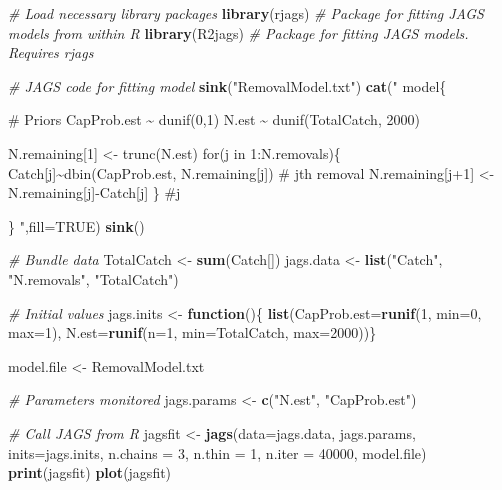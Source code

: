 \documentclass[
]{krantz}
\makeatletter
\newenvironment{Shaded}{\begin{snugshade}}{\end{snugshade}}
\newcommand{\AttributeTok}[1]{\textcolor[rgb]{0.27,0.27,0.27}{#1}}
\newcommand{\CommentTok}[1]{\textcolor[rgb]{0.37,0.37,0.37}{\textit{#1}}}
\newcommand{\ConstantTok}[1]{\textcolor[rgb]{0.37,0.37,0.37}{#1}}
\newcommand{\ControlFlowTok}[1]{\textcolor[rgb]{0.27,0.27,0.27}{\textbf{#1}}}
\newcommand{\DecValTok}[1]{\textcolor[rgb]{0.06,0.06,0.06}{#1}}
\newcommand{\FunctionTok}[1]{\textcolor[rgb]{0.27,0.27,0.27}{\textbf{#1}}}
\newcommand{\NormalTok}[1]{#1}
\newcommand{\OtherTok}[1]{\textcolor[rgb]{0.37,0.37,0.37}{#1}}
\newcommand{\StringTok}[1]{\textcolor[rgb]{0.5,0.5,0.5}{#1}}
\newenvironment{kframe}{%
\medskip{}
\setlength{\fboxsep}{.8em}
 \def\at@end@of@kframe{}%
 \ifinner\ifhmode%
  \def\at@end@of@kframe{\end{minipage}}%
  \begin{minipage}{\columnwidth}%
 \fi\fi%
 \def\FrameCommand##1{\hskip\@totalleftmargin \hskip-\fboxsep
 \colorbox{shadecolor}{##1}\hskip-\fboxsep
     \hskip-\linewidth \hskip-\@totalleftmargin \hskip\columnwidth}%
 \MakeFramed {\advance\hsize-\width
   \@totalleftmargin\z@ \linewidth\hsize
   \@setminipage}}%
 {\par\unskip\endMakeFramed%
 \at@end@of@kframe}
\renewenvironment{Shaded}{\begin{kframe}}{\end{kframe}}
\makeatother
\begin{document}
\begin{Shaded}
\begin{Highlighting}[]
\CommentTok{\# Load necessary library packages}
\FunctionTok{library}\NormalTok{(rjags)   }\CommentTok{\# Package for fitting JAGS models from within R}
\FunctionTok{library}\NormalTok{(R2jags)  }\CommentTok{\# Package for fitting JAGS models. Requires rjags}

\CommentTok{\# JAGS code for fitting model}
\FunctionTok{sink}\NormalTok{(}\StringTok{"RemovalModel.txt"}\NormalTok{)}
  \FunctionTok{cat}\NormalTok{(}\StringTok{"}
\StringTok{model\{}

\StringTok{\# Priors}
\StringTok{ CapProb.est \textasciitilde{} dunif(0,1)}
\StringTok{ N.est \textasciitilde{} dunif(TotalCatch, 2000)}

\StringTok{ N.remaining[1] \textless{}{-} trunc(N.est)}
\StringTok{ for(j in 1:N.removals)\{}
\StringTok{      Catch[j]\textasciitilde{}dbin(CapProb.est, N.remaining[j]) \# jth removal}
\StringTok{      N.remaining[j+1] \textless{}{-} N.remaining[j]{-}Catch[j]}
\StringTok{  \} \#j}

\StringTok{\}}
\StringTok{      "}\NormalTok{,}\AttributeTok{fill=}\ConstantTok{TRUE}\NormalTok{)}
  \FunctionTok{sink}\NormalTok{()}

     \CommentTok{\# Bundle data}
\NormalTok{  TotalCatch }\OtherTok{\textless{}{-}} \FunctionTok{sum}\NormalTok{(Catch[])}
\NormalTok{  jags.data }\OtherTok{\textless{}{-}} \FunctionTok{list}\NormalTok{(}\StringTok{"Catch"}\NormalTok{, }\StringTok{"N.removals"}\NormalTok{, }\StringTok{"TotalCatch"}\NormalTok{)}


  \CommentTok{\# Initial values}
\NormalTok{  jags.inits }\OtherTok{\textless{}{-}} \ControlFlowTok{function}\NormalTok{()\{ }\FunctionTok{list}\NormalTok{(}\AttributeTok{CapProb.est=}\FunctionTok{runif}\NormalTok{(}\DecValTok{1}\NormalTok{, }\AttributeTok{min=}\DecValTok{0}\NormalTok{, }\AttributeTok{max=}\DecValTok{1}\NormalTok{),}
                                  \AttributeTok{N.est=}\FunctionTok{runif}\NormalTok{(}\AttributeTok{n=}\DecValTok{1}\NormalTok{, }\AttributeTok{min=}\NormalTok{TotalCatch,}
                                  \AttributeTok{max=}\DecValTok{2000}\NormalTok{))\}}

\NormalTok{  model.file }\OtherTok{\textless{}{-}} \StringTok{\textquotesingle{}RemovalModel.txt\textquotesingle{}}

  \CommentTok{\# Parameters monitored}
\NormalTok{  jags.params }\OtherTok{\textless{}{-}} \FunctionTok{c}\NormalTok{(}\StringTok{"N.est"}\NormalTok{, }\StringTok{"CapProb.est"}\NormalTok{)}

   \CommentTok{\# Call JAGS from R}
\NormalTok{  jagsfit }\OtherTok{\textless{}{-}} \FunctionTok{jags}\NormalTok{(}\AttributeTok{data=}\NormalTok{jags.data, jags.params, }\AttributeTok{inits=}\NormalTok{jags.inits,}
                  \AttributeTok{n.chains =} \DecValTok{3}\NormalTok{, }\AttributeTok{n.thin =} \DecValTok{1}\NormalTok{, }\AttributeTok{n.iter =} \DecValTok{40000}\NormalTok{,}
\NormalTok{                  model.file)}
  \FunctionTok{print}\NormalTok{(jagsfit)}
  \FunctionTok{plot}\NormalTok{(jagsfit)}
\end{Highlighting}
\end{Shaded}
\end{document}
